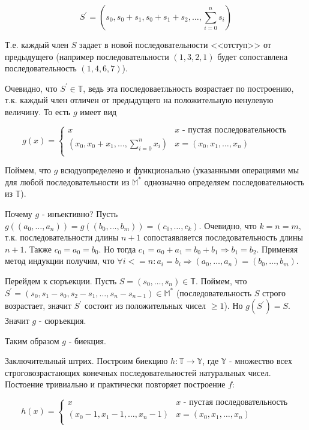 \documentclass{article}
\newcommand{\pr}{^{\prime}}
\newcommand{\M}{\mathbb{M}}
\newcommand{\T}{\mathbb{T}}
\newcommand{\Y}{\mathbb{Y}}
\begin{document}
    $$S\pr = (s_0, s_0 + s_1, s_0 + s_1 + s_2, \ldots, \sum_{i=0}^{n} s_i)$$ 
    
    Т.е. каждый член $S$ задает в новой последовательности <<отступ>> от предыдущего (например последовательности $(1, 3, 2, 1)$ будет сопоставлена последовательность $(1, 4, 6, 7)$).

    Очевидно, что $S\pr \in \T$, ведь эта последоваетльность возрастает по построению, т.к. каждый член отличен от предыдущего на положительную ненулевую величину. То есть $g$ имеет вид

    \begin{equation*}
        g(x) = 
         \begin{cases}
           x &\text{$x$ - пустая последовательность}\\
           (x_0, x_0 + x_1, \ldots, \sum_{i=0}^{n} x_i) &\text{$x = (x_0, x_1, \ldots, x_n)$}\\
         \end{cases}
    \end{equation*}

    Поймем, что $g$ всюдуопределено и функционально (указанными операциями мы для любой последовательности из $\M^*$ однозначно определяем последовательность из $\T$).

    Почему $g$ - инъективно? Пусть $g\left((a_0, \ldots, a_n)\right) = g\left((b_0, \ldots, b_m)\right) = (c_0, \ldots, c_k)$. Очевидно, что $k = n = m$, т.к. последовательности длины $n + 1$ сопостаявляется последовательность длины $n + 1$. Также $c_0 = a_0 = b_0$. Но тогда $c_1 = a_0 + a_1 = b_0 + b_1 \Rightarrow b_1 = b_2$. Применяя метод индукции получим, что $\forall i <= n: a_i = b_i \Rightarrow (a_0, \ldots, a_n) = (b_0, \ldots, b_m)$.

    Перейдем к сюръекции. Пусть $S = (s_0, \ldots, s_n) \in \T$. Поймем, что $S\pr = (s_0, s_1 - s_0, s_2 - s_1, \ldots, s_n - s_{n - 1}) \in \M^*$ (последовательность $S$ строго возрастает, значит $S\pr$ состоит из положительных чисел $\ge 1$). Но $g(S\pr) = S$. Значит $g$ - сюръекция.

    Таким образом $g$ - биекция.

    Заключительный штрих. Построим биекцию $h: \T \rightarrow \Y$, где $\Y$ - множество всех строговозрастающих конечных последовательностей натуральных чисел. Постоение тривиально и практически повторяет построение $f$:

    \begin{equation*}
        h(x) = 
         \begin{cases}
           x &\text{$x$ - пустая последовательность}\\
           (x_0 - 1, x_1 - 1, \ldots, x_n - 1) &\text{$x = (x_0, x_1, \ldots, x_n)$}\\
         \end{cases}
    \end{equation*}
\end{document}

